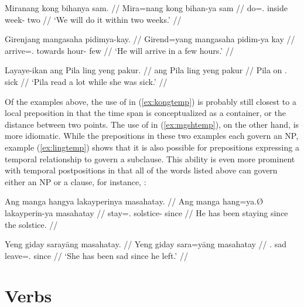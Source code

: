 \pex
\a\label{ex:kongtemp}\begingl
	\gla Miranang kong bihanya sam. //
	\glb Mira=nang kong bihan-ya sam //
	\glc do=\Fpl{}.\Aarg{} inside week-\Loc{} two //
	\glft `We will do it within two weeks.' //
\endgl

\a\label{ex:mgshtemp}\begingl
	\gla Girenjang mangasaha pidimya-kay. //
	\glb Girend=yang mangasaha {pidim-ya kay} //
	\glc arrive=\TsgM{}.\Aarg{} towards {hour-\Loc{} few} //
	\glft `He will arrive in a few hours.' //
\endgl

\a\label{ex:lingtemp}\begingl
	\gla Layaye-ikan ang Pila ling yeng pakur. //
	 ang Pila ling yeng pakur //
	 \Aarg{} Pila on \TsgF{}.\Aarg{} sick //
	\glft `Pila read a lot while she was sick.' //
\endgl

\xe

Of the examples above, the use of  in (\ref{ex:kongtemp}) is
probably still closest to a local preposition in that the time span is
conceptualized as a container, or the distance between two points. The use of
 in (\ref{ex:mgshtemp}), on the other hand, is more
idiomatic. While the prepositions in these two examples each govern an NP,
example (\ref{ex:lingtemp}) shows that it is also possible for prepositions
expressing a temporal relationship to govern a subclause. This ability is even
more prominent with temporal postpositions in that all of the words listed
above can govern either an NP or a clause, for instance,
:

\pex
\a\label{ex:mshtaynp}\begingl
	\gla Ang manga hangya lakayperinya masahatay. //
	\glb Ang manga hang=ya.Ø lakayperin-ya masahatay //
	\glc \AgtT{} \Prog{} stay=\TsgM{}.\Top{} solstice-\Loc{} since //
	\glft He has been staying since the solstice. //
\endgl

\a\label{ex:mshtays}\begingl
	\gla Yeng giday sarayāng masahatay. //
	\glb Yeng giday sara=yāng masahatay //
	\glc \TsgF{}.\Aarg{} sad leave=\TsgM{}.\Aarg{} since //
	\glft `She has been sad since he left.' //
\endgl

\xe



\section{Verbs}

